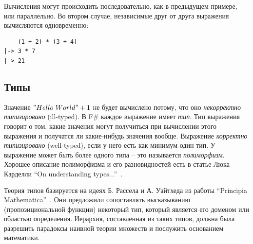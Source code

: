 \documentclass[a4paper,11pt]{article}
\begin{document}
Вычисления могут происходить последовательно, как в предыдущем примере, или
параллельно. Во втором случае, независимые друг от друга выражения вычисляются
одновременно:
\begin{lstlisting}
    (1 + 2) * (3 + 4)
|-> 3 * 7
|-> 21
\end{lstlisting}

\subsection{Типы}

Значение $"Hello~World" + 1$ не будет вычислено потому, что оно
\emph{некорректно типизировано} (ill-typed). В F\# каждое выражение имеет
\emph{тип}. Тип выражения говорит о том, какие значения могут получиться при
вычислении этого выражения и получатся ли какие-нибудь значения вообще.
Выражение \emph{корректно типизировано} (well-typed), если у него есть как 
минимум один тип. У выражение может быть более одного типа -- это называется
\emph{полиморфизм}. Хорошее описание полиморфизма и его разновидностей есть в
статье Люка Карделли ``On understanding types...''~\cite{Cardelli}.

Теория типов базируется на идеях Б. Рассела и А. Уайтхеда из работы ``Principia
Mathematica''~\cite{Russell}. Они предложили сопоставлять высказыванию
(пропозициональной функции) некоторый тип, который является его доменом или
областью определения. Иерархия, составленная из таких типов, должна была
разрешить парадоксы наивной теории множеств и послужить основанием математики.
\end{document}
